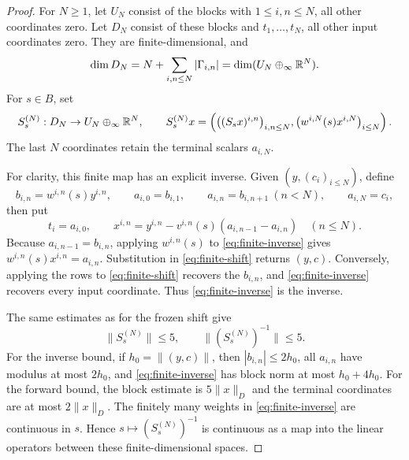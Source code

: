 \begin{proof}
For \(N\geq1\), let \(U_N\) consist of the blocks with
\(1\leq i,n\leq N\), all other coordinates zero. Let \(D_N\) consist
of these blocks and \(t_1,\ldots,t_N\), all other input coordinates
zero. They are finite-dimensional, and
\begin{equation}
 \dim D_N=N+\sum_{i,n\leq N}|\Gamma_{i,n}|
          =\dim(U_N\oplus_\infty\mathbb R^N).                       \label{eq:finite-dimensions}
\end{equation}
For \(s\in B\), set
\begin{equation}
 S_s^{(N)}:D_N\to U_N\oplus_\infty\mathbb R^N,\qquad
 S_s^{(N)}x=
 \left(\bigl((S_sx)^{i,n}\bigr)_{i,n\leq N},
       \bigl(w^{i,N}(s)x^{i,N}\bigr)_{i\leq N}\right).        \label{eq:finite-shift}
\end{equation}
The last \(N\) coordinates retain the terminal scalars \(a_{i,N}\).

For clarity, this finite map has an explicit inverse. Given
\((y,(c_i)_{i\leq N})\), define
\[
 b_{i,n}=w^{i,n}(s)y^{i,n},\qquad
 a_{i,0}=b_{i,1},\qquad
 a_{i,n}=b_{i,n+1}\ (n<N),\qquad a_{i,N}=c_i,
\]
then put
\begin{equation}
 t_i=a_{i,0},\qquad
 x^{i,n}=y^{i,n}
          -v^{i,n}(s)(a_{i,n-1}-a_{i,n})\quad(n\leq N).      \label{eq:finite-inverse}
\end{equation}
Because \(a_{i,n-1}=b_{i,n}\), applying \(w^{i,n}(s)\) to \eqref{eq:finite-inverse}
gives \(w^{i,n}(s)x^{i,n}=a_{i,n}\). Substitution in \eqref{eq:finite-shift} returns
\((y,c)\). Conversely, applying the rows to \eqref{eq:finite-shift} recovers the
\(b_{i,n}\), and \eqref{eq:finite-inverse} recovers every input coordinate. Thus \eqref{eq:finite-inverse}
is the inverse.

The same estimates as for the frozen shift give
\begin{equation}
                  \|S_s^{(N)}\|\leq5,\qquad
                  \|(S_s^{(N)})^{-1}\|\leq5.                \label{eq:finite-bounds}
\end{equation}
For the inverse bound, if \(h_0=\|(y,c)\|\), then
\(|b_{i,n}|\leq2h_0\), all \(a_{i,n}\) have modulus at most \(2h_0\),
and \eqref{eq:finite-inverse} has block norm at most \(h_0+4h_0\). For the forward bound,
the block estimate is \(5\|x\|_D\) and the terminal coordinates
are at most \(2\|x\|_D\). The finitely many weights in \eqref{eq:finite-inverse} are
continuous in \(s\). Hence \(s\mapsto(S_s^{(N)})^{-1}\) is continuous
as a map into the linear operators between these finite-dimensional
spaces.


\end{proof}
